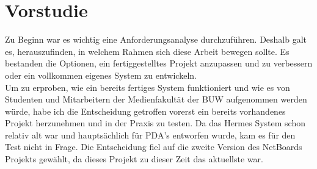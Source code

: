 \chapter{Vorstudie}\label{Vorstudie}
Zu Beginn war es wichtig eine Anforderungsanalyse durchzuführen. Deshalb galt es, herauszufinden, in welchem Rahmen sich diese Arbeit bewegen sollte. Es bestanden die Optionen, ein fertiggestelltes Projekt anzupassen und zu verbessern oder ein vollkommen eigenes System zu entwickeln.\\
Um zu erproben, wie ein bereits fertiges System funktioniert und wie es von Studenten und Mitarbeitern der Medienfakultät der BUW aufgenommen werden würde, habe ich die Entscheidung getroffen vorerst ein bereits vorhandenes Projekt herzunehmen und in der Praxis zu testen.
Da das Hermes System schon relativ alt war und hauptsächlich für PDA's entworfen wurde, kam es für den Test nicht in Frage.
Die Entscheidung fiel auf die zweite Version des NetBoards Projekts\cite{netboards:website} gewählt, da dieses Projekt zu dieser Zeit das aktuellste war.
